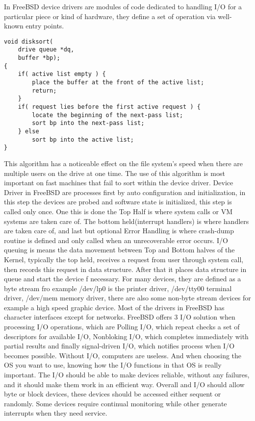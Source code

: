 \documentclass[letterpaper,10pt,draftclsnofoot,onecolumn]{IEEEtran}
\begin{document}
In FreeBSD device drivers are modules of code dedicated to handling I/O for a particular piece or kind of hardware, they define a set of operation via well-known entry points.
\begin{lstlisting}
void disksort(
	drive queue *dq,
	buffer *bp);
{
	if( active list empty ) {
		place the buffer at the front of the active list;
		return;
	}
	if( request lies before the first active request ) {
		locate the beginning of the next-pass list;
		sort bp into the next-pass list;
	} else
		sort bp into the active list;
}
\end{lstlisting}
This algorithm has a noticeable effect on the file system's speed when there are multiple users on the drive at one time. The use of this algorithm is most important on fast machines that fail to sort within the device driver.
Device Driver in FreeBSD are processes first by auto configuration and initialization, in this step the devices are probed and software state is initialized, this step is called only once. One this is done the Top Half is where system calls or VM systems are taken care of. The bottom held(interrupt handlers) is where handlers are taken care of, and last but optional Error Handling is where crash-dump routine is defined and only called when an unrecoverable error occurs. I/O queuing is means the data movement between Top and Bottom halves of the Kernel, typically the top held, receives a request from user through system call, then records this request in data structure. After that it places data structure in queue and start the device f necessary. For many devices, they are defined as a byte stream fro example /dev/lp0 is the printer driver, /dev/tty00 terminal driver, /dev/mem memory driver, there are also some non-byte stream devices for example a high speed graphic device. Most of the drivers in FreeBSD has character interfaces except for networks.
FreeBSD offers 3 I/O solution when processing I/O operations, which are Polling I/O, which repeat checks a set of descriptors for available I/O, Nonbloking I/O, which completes immediately with partial results and finally signal-driven I/O, which notifies process when I/O becomes possible.\cite{[2]}
Without I/O, computers are useless. And when choosing the OS you want to use, knowing how the I/O functions in that OS is really important. The I/O should be able to make devices reliable, without any failures, and it should make them work in an efficient way. Overall and I/O should allow byte or block devices, these devices should be accessed either sequent or randomly. Some devices require continual monitoring while other generate interrupts when they need service.
\end{document}
